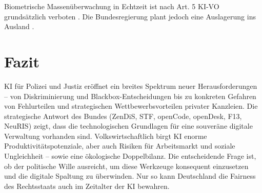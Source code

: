 \documentclass[12pt,a4paper]{article}
\begin{document}
	Biometrische Massenüberwachung in Echtzeit ist nach Art. 5 KI-VO grundsätzlich verboten \cite{RAV2025}. Die Bundesregierung plant jedoch eine Auslagerung ins Ausland \cite{Gruene2026}.
	
	\section{Fazit}
	
	KI für Polizei und Justiz eröffnet ein breites Spektrum neuer Herausforderungen – von Diskriminierung und Blackbox-Entscheidungen bis zu konkreten Gefahren von Fehlurteilen und strategischen Wettbewerbsvorteilen privater Kanzleien. Die strategische Antwort des Bundes (ZenDiS, STF, openCode, openDesk, F13, NeuRIS) zeigt, dass die technologischen Grundlagen für eine souveräne digitale Verwaltung vorhanden sind. Volkswirtschaftlich birgt KI enorme Produktivitätspotenziale, aber auch Risiken für Arbeitsmarkt und soziale Ungleichheit – sowie eine ökologische Doppelbilanz. Die entscheidende Frage ist, ob der politische Wille ausreicht, um diese Werkzeuge konsequent einzusetzen und die digitale Spaltung zu überwinden. Nur so kann Deutschland die Fairness des Rechtsstaats auch im Zeitalter der KI bewahren.
	
\end{document}
